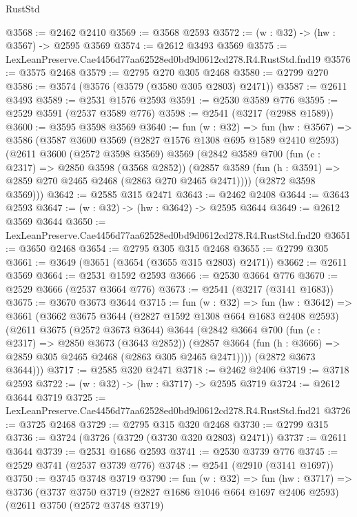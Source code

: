 \begin{lexlean}{RustStd}
\begin{coremodule}
@3568 := @2462 @2410
@3569 := @3568 @2593
@3572 := (w : @32) -> (hw : @3567) -> @2595 @3569
@3574 := @2612 @3493 @3569
@3575 := LexLeanPreserve.Cae4456d77aa62528ed0bd9d0612cd278.R4.RustStd.fnd19
@3576 := @3575 @2468
@3579 := @2795 @270 @305 @2468
@3580 := @2799 @270
@3586 := @3574 (@3576 (@3579 (@3580 @305 @2803) @2471))
@3587 := @2611 @3493
@3589 := @2531 @1576 @2593
@3591 := @2530 @3589 @776
@3595 := @2529 @3591 (@2537 @3589 @776)
@3598 := @2541 (@3217 (@2988 @1589))
@3600 := @3595 @3598 @3569
@3640 := fun (w : @32) =>
  fun (hw : @3567) =>
  @3586
    (@3587
      @3600
      @3569
      (@2827 @1576 @1308 @695 @1589 @2410 @2593)
      (@2611
        @3600
        (@2572 @3598 @3569)
        @3569
        (@2842
          @3589
          @700
          (fun (c : @2317) => @2850 @3598 (@3568 @2852))
          (@2857 @3589 (fun (h : @3591) => @2859 @270 @2465 @2468 (@2863 @270 @2465 @2471))))
        (@2872 @3598 @3569)))
@3642 := @2585 @315 @2471
@3643 := @2462 @2408
@3644 := @3643 @2593
@3647 := (w : @32) -> (hw : @3642) -> @2595 @3644
@3649 := @2612 @3569 @3644
@3650 := LexLeanPreserve.Cae4456d77aa62528ed0bd9d0612cd278.R4.RustStd.fnd20
@3651 := @3650 @2468
@3654 := @2795 @305 @315 @2468
@3655 := @2799 @305
@3661 := @3649 (@3651 (@3654 (@3655 @315 @2803) @2471))
@3662 := @2611 @3569
@3664 := @2531 @1592 @2593
@3666 := @2530 @3664 @776
@3670 := @2529 @3666 (@2537 @3664 @776)
@3673 := @2541 (@3217 (@3141 @1683))
@3675 := @3670 @3673 @3644
@3715 := fun (w : @32) =>
  fun (hw : @3642) =>
  @3661
    (@3662
      @3675
      @3644
      (@2827 @1592 @1308 @664 @1683 @2408 @2593)
      (@2611
        @3675
        (@2572 @3673 @3644)
        @3644
        (@2842
          @3664
          @700
          (fun (c : @2317) => @2850 @3673 (@3643 @2852))
          (@2857 @3664 (fun (h : @3666) => @2859 @305 @2465 @2468 (@2863 @305 @2465 @2471))))
        (@2872 @3673 @3644)))
@3717 := @2585 @320 @2471
@3718 := @2462 @2406
@3719 := @3718 @2593
@3722 := (w : @32) -> (hw : @3717) -> @2595 @3719
@3724 := @2612 @3644 @3719
@3725 := LexLeanPreserve.Cae4456d77aa62528ed0bd9d0612cd278.R4.RustStd.fnd21
@3726 := @3725 @2468
@3729 := @2795 @315 @320 @2468
@3730 := @2799 @315
@3736 := @3724 (@3726 (@3729 (@3730 @320 @2803) @2471))
@3737 := @2611 @3644
@3739 := @2531 @1686 @2593
@3741 := @2530 @3739 @776
@3745 := @2529 @3741 (@2537 @3739 @776)
@3748 := @2541 (@2910 (@3141 @1697))
@3750 := @3745 @3748 @3719
@3790 := fun (w : @32) =>
  fun (hw : @3717) =>
  @3736
    (@3737
      @3750
      @3719
      (@2827 @1686 @1046 @664 @1697 @2406 @2593)
      (@2611
        @3750
        (@2572 @3748 @3719)

\end{coremodule}
\end{lexlean}
